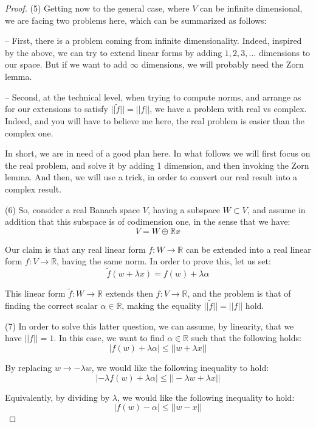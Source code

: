 \documentclass[12pt]{amsbook}
\begin{document}
\begin{proof}
\medskip

(5) Getting now to the general case, where $V$ can be infinite dimensional, we are facing two problems here, which can be summarized as follows:

\medskip

-- First, there is a problem coming from infinite dimensionality. Indeed, inspired by the above, we can try to extend linear forms by adding $1,2,3,\ldots$ dimensions to our space. But if we want to add $\infty$ dimensions, we will probably need the Zorn lemma.

\medskip

-- Second, at the technical level, when trying to compute norms, and arrange as for our extensions to satisfy $||\tilde{f}||=||f||$, we have a problem with real vs complex. Indeed, and you will have to believe me here, the real problem is easier than the complex one.

\medskip

In short, we are in need of a good plan here. In what follows we will first focus on the real problem, and solve it by adding 1 dimension, and then invoking the Zorn lemma. And then, we will use a trick, in order to convert our real result into a complex result.

\medskip

(6) So, consider a real Banach space $V$, having a subspace $W\subset V$, and assume in addition that this subspace is of codimension one, in the sense that we have:
$$V=W\oplus\mathbb Rx$$

Our claim is that any real linear form $f:W\to\mathbb R$ can be extended into a real linear form $f:V\to\mathbb R$, having the same norm. In order to prove this, let us set:
$$\tilde{f}(w+\lambda x)=f(w)+\lambda\alpha$$

This linear form $\tilde{f}:W\to\mathbb R$ extends then $f:V\to\mathbb R$, and the problem is that of finding the correct scalar $\alpha\in\mathbb R$, making the equality $||\tilde{f}||=||f||$ hold. 

\medskip

(7) In order to solve this latter question, we can assume, by linearity, that we have $||f||=1$. In this case, we want to find $\alpha\in\mathbb R$ such that the following holds:
$$|f(w)+\lambda\alpha|\leq||w+\lambda x||$$

By replacing $w\to-\lambda w$, we would like the following inequality to hold:
$$|-\lambda f(w)+\lambda\alpha|\leq||-\lambda w+\lambda x||$$

Equivalently, by dividing by $\lambda$, we would like the following inequality to hold:
$$|f(w)-\alpha|\leq||w-x||$$


\end{proof}
\end{document}
